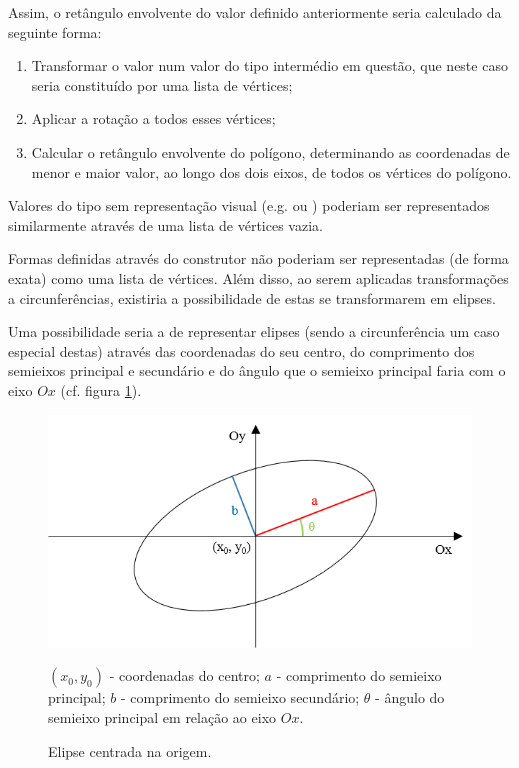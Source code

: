 \documentclass[a4paper]{article}
\begin{document}
Assim, o retângulo envolvente do valor  definido anteriormente seria calculado da seguinte forma:

\begin{enumerate}
	\item Transformar o valor  num valor do tipo intermédio em questão, que neste caso seria constituído por uma lista de vértices;
	\item Aplicar a rotação a todos esses vértices;
	\item Calcular o retângulo envolvente do polígono, determinando as coordenadas de menor e maior valor, ao longo dos dois eixos, de todos os vértices do polígono.
\end{enumerate}

Valores do tipo  sem representação visual (e.g.  ou ) poderiam ser representados similarmente através de uma lista de vértices vazia.

Formas definidas através do construtor  não poderiam ser representadas (de forma exata) como uma lista de vértices. Além disso, ao serem aplicadas transformações a circunferências, existiria a possibilidade de estas se transformarem em elipses.

\bigskip

Uma possibilidade seria a de representar elipses (sendo a circunferência um caso especial destas) através das coordenadas do seu centro, do comprimento dos semieixos principal e secundário e do ângulo que o semieixo principal faria com o eixo \(Ox\) (cf. figura \ref{fig:ellipse}).

\begin{figure}[ht]
	\centering
	\includegraphics{images/ellipse.png}
	\caption{Elipse centrada na origem.}
	\label{fig:ellipse}
	\smallskip\small
	\((x_0, y_0)\) - coordenadas do centro; \(a\) - comprimento do semieixo principal; \(b\) - comprimento do semieixo secundário; \(\theta\) - ângulo do semieixo principal em relação ao eixo \(Ox\).
\end{figure}
\end{document}
